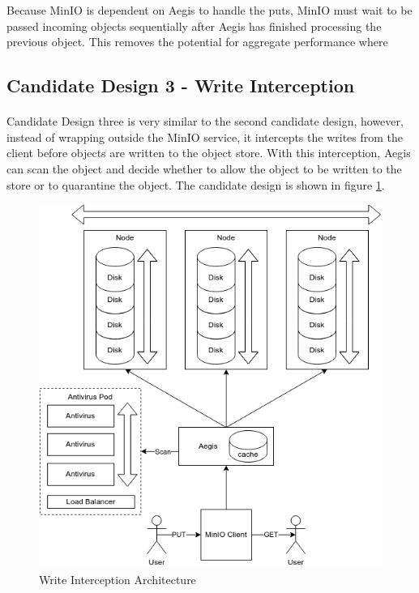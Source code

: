 \documentclass[12pt, conference, final, a4paper, onecolumn, compsoc]{IEEEtran}
\begin{document}

Because MinIO is dependent on Aegis to handle the puts, MinIO must wait to be
passed incoming objects sequentially after Aegis has finished processing the
previous object. This removes the potential for aggregate performance where


\subsection{Candidate Design 3 - Write Interception}
\paragraph{}

Candidate Design three is very similar to the second candidate design, however,
instead of wrapping outside the MinIO service, it intercepts the writes from the
client before objects are written to the object store. With this interception,
Aegis can scan the object and decide whether to allow the object to be written
to the store or to quarantine the object. The candidate design is shown in
figure \ref{fig:writeInterceptArch}.

\begin{figure}
  \centering \includegraphics[scale=.3]{diagrams/write-intercept.png}
  \caption{Write Interception Architecture}
  \label{fig:writeInterceptArch}
\end{figure}
\end{document}
